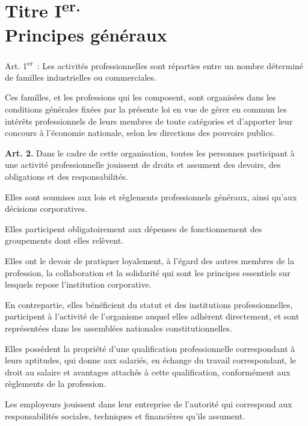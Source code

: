 \documentclass[french,twoside]{book} %
\newcommand{\labelchar}[1]{\textbf{\color{rubric} #1}}
\begin{document}
\section[{Titre Ier. Principes généraux}]{Titre I\textsuperscript{er.} \\
Principes généraux}\renewcommand{\leftmark}{Titre I\textsuperscript{er.} \\
Principes généraux}

\noindent Art. 1\textsuperscript{er} : Les activités professionnelles sont réparties entre un nombre déterminé de familles industrielles ou commerciales.\par
Ces familles, et les professions qui les composent, sont organisées dans les conditions générales fixées par la présente loi en vue de gérer en commun les intérêts professionnels de leurs membres de toute catégories et d’apporter leur concours à l’économie nationale, selon les directions des pouvoirs publics.\par
\bigbreak
\noindent \labelchar{Art. 2.} Dans le cadre de cette organisation, toutes les personnes participant à une activité professionnelle jouissent de droits et assument des devoirs, des obligations et des responsabilités.\par
Elles sont soumises aux lois et règlements professionnels généraux, ainsi qu’aux décisions corporatives.\par
Elles participent obligatoirement aux dépenses de fonctionnement des groupements dont elles relèvent.\par
Elles ont le devoir de pratiquer loyalement, à l’égard des autres membres de la profession, la collaboration et la solidarité qui sont les principes essentiels sur lesquels repose l’institution corporative.\par
En contrepartie, elles bénéficient du statut et des institutions professionnelles, participent à l’activité de l’organisme auquel elles adhèrent directement, et sont représentées dans les assemblées nationales constitutionnelles.\par
Elles possèdent la propriété d’une qualification professionnelle correspondant à leurs aptitudes, qui donne aux salariés, en échange du travail correspondant, le droit au salaire et avantages attachés à cette qualification, conformément aux règlements de la profession.\par
Les employeurs jouissent dans leur entreprise de l’autorité qui correspond aux responsabilités sociales, techniques et financières qu’ils assument.\par
\end{document}
